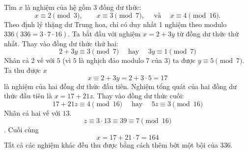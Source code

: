 \begin{example}
	Tìm $x$ là nghiệm của hệ gồm 3 đồng dư thức:
	\begin{equation}
		x \equiv 2 \pmod{3}, \quad \quad x \equiv 3 \pmod{7}, \quad \text{ và } \quad x \equiv 4 \pmod{16}.
	\end{equation}
	Theo định lý thặng dư Trung hoa, chỉ có duy nhất 1 nghiệm theo modulo $336 (336 = 3 \cdot 7 \cdot 16)$.
	Ta bắt đầu với nghiệm $x=2 +3y $ từ đồng dư thức thứ nhất. Thay vào đồng dư thức thứ hai:
	$$2 + 3y \equiv 3 \pmod{7} \quad \text{ hay } \quad 3y \equiv 1 \pmod{7}$$
	Nhân cả 2 vế với $5$ (vì $5$ là nghịch đảo modulo $7$ của $3$) ta được $y \equiv 5 \pmod{7}$. Ta thu được $x$
	$$ x \equiv 2 + 3y = 2 + 3 \cdot 5 = 17$$
	là nghiệm của hai đồng dư thức đầu tiên.
	Nghiệm tổng quát của hai đồng dư thức đầu tiên là $x=17 + 21z$. Thay vào đồng dư thức cuối:
	$$ 17 + 21z \equiv 4 \pmod{16} \quad \text{ hay } \quad 5z \equiv 3 \pmod{16}$$
	Nhân cả hai vế với $13$.
	$$ z \equiv 3 \cdot 13 \equiv 39 \equiv 7 \pmod{16}$$.
	Cuối cùng
	$$ x = 17 + 21 \cdot 7 = 164$$
	Tất cả các nghiệm khác đều thu được bằng cách thêm bớt một bội của $336$.
\end{example}


